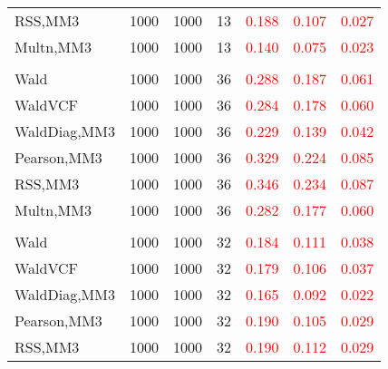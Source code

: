 \documentclass[
]{article}
\begin{document}
\begin{table}[H]
{\begin{tabular}[t]{lrrrrrr}
\hspace{1em}RSS,MM3 & 1000 & 1000 & 13 & \textcolor{red}{0.188} & \textcolor{red}{0.107} & \textcolor{red}{0.027}\\
\hspace{1em}Multn,MM3 & 1000 & 1000 & 13 & \textcolor{red}{0.140} & \textcolor{red}{0.075} & \textcolor{red}{0.023}\\
\addlinespace[0.3em]
\multicolumn{7}{l}{\textbf{1F 15V}}\\
\hspace{1em}Wald & 1000 & 1000 & 36 & \textcolor{red}{0.288} & \textcolor{red}{0.187} & \textcolor{red}{0.061}\\
\hspace{1em}WaldVCF & 1000 & 1000 & 36 & \textcolor{red}{0.284} & \textcolor{red}{0.178} & \textcolor{red}{0.060}\\
\hspace{1em}WaldDiag,MM3 & 1000 & 1000 & 36 & \textcolor{red}{0.229} & \textcolor{red}{0.139} & \textcolor{red}{0.042}\\
\hspace{1em}Pearson,MM3 & 1000 & 1000 & 36 & \textcolor{red}{0.329} & \textcolor{red}{0.224} & \textcolor{red}{0.085}\\
\hspace{1em}RSS,MM3 & 1000 & 1000 & 36 & \textcolor{red}{0.346} & \textcolor{red}{0.234} & \textcolor{red}{0.087}\\
\hspace{1em}Multn,MM3 & 1000 & 1000 & 36 & \textcolor{red}{0.282} & \textcolor{red}{0.177} & \textcolor{red}{0.060}\\
\addlinespace[0.3em]
\multicolumn{7}{l}{\textbf{2F 10V}}\\
\hspace{1em}Wald & 1000 & 1000 & 32 & \textcolor{red}{0.184} & \textcolor{red}{0.111} & \textcolor{red}{0.038}\\
\hspace{1em}WaldVCF & 1000 & 1000 & 32 & \textcolor{red}{0.179} & \textcolor{red}{0.106} & \textcolor{red}{0.037}\\
\hspace{1em}WaldDiag,MM3 & 1000 & 1000 & 32 & \textcolor{red}{0.165} & \textcolor{red}{0.092} & \textcolor{red}{0.022}\\
\hspace{1em}Pearson,MM3 & 1000 & 1000 & 32 & \textcolor{red}{0.190} & \textcolor{red}{0.105} & \textcolor{red}{0.029}\\
\hspace{1em}RSS,MM3 & 1000 & 1000 & 32 & \textcolor{red}{0.190} & \textcolor{red}{0.112} & \textcolor{red}{0.029}\\

\end{tabular}}
\end{table}
\end{document}
